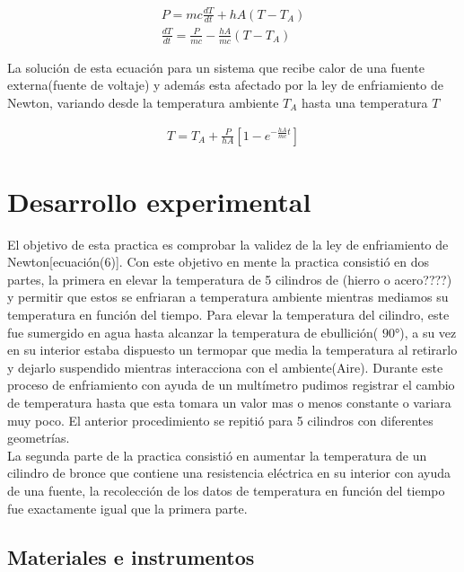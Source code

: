 \documentclass{article}
\begin{document}
\begin{align}
    P = mc \frac{dT}{dt} + hA(T-T_A) \\ 
    \frac{dT}{dt} = \frac{P}{mc} - \frac{hA}{mc}(T-T_A)
\end{align}

La solución de esta ecuación para un sistema que recibe calor de una fuente externa(fuente de voltaje) y además esta afectado por la ley de enfriamiento de Newton, variando desde la temperatura ambiente $T_A$ hasta una temperatura $T$

\begin{align}
    T = T_A +\frac{P}{hA}[1-e^{-\frac{hA}{mc}t}]
\end{align}


\section{Desarrollo experimental}

El objetivo de esta practica es comprobar la validez de la ley de enfriamiento de Newton[ecuación(6)]. Con este objetivo en mente la practica consistió en dos partes, la primera en elevar la temperatura de 5 cilindros de (hierro o acero????)  y permitir que estos se enfriaran a temperatura ambiente mientras mediamos su temperatura en función del tiempo. 
Para elevar la temperatura del cilindro, este fue sumergido en agua hasta alcanzar la temperatura de ebullición( $90°$), a su vez en su interior estaba dispuesto un termopar que media la temperatura al retirarlo y dejarlo suspendido mientras interacciona con el ambiente(Aire). Durante este proceso de enfriamiento con ayuda de un multímetro pudimos registrar el cambio de temperatura hasta que esta tomara un valor mas o menos constante o variara muy poco. El anterior procedimiento se repitió para 5 cilindros con diferentes geometrías.  \\ 
La segunda parte de la practica consistió en aumentar la temperatura de un cilindro de bronce que contiene una resistencia eléctrica en su interior con ayuda de una fuente, la recolección de los datos de temperatura en función del tiempo fue exactamente igual que la primera parte.


\subsection{Materiales e instrumentos}
\end{document}

